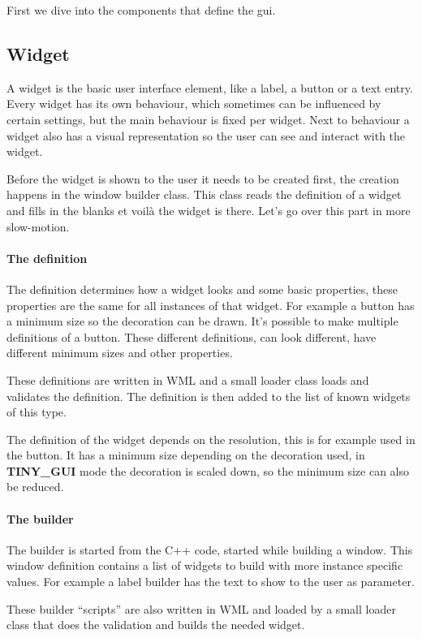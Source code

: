First we dive into the components that define the gui.

\subsection{Widget}

A widget is the basic user interface element, like a label, a button or a text
entry. Every widget has its own behaviour, which sometimes can be influenced by
certain settings, but the main behaviour is fixed per widget. Next to behaviour
a widget also has a visual representation so the user can see and interact with
the widget.

Before the widget is shown to the user it needs to be created first, the
creation happens in the window builder class. This class reads the definition of
a widget and fills in the blanks et voil\`a the widget is there. Let's go over
this part in more slow-motion.

\paragraph{The definition}
The definition determines how a widget looks and some basic properties, these
properties are the same for all instances of that widget. For example a button
has a minimum size so the decoration can be drawn. It's possible to make
multiple definitions of a button. These different definitions, can look
different, have different minimum sizes and other properties.

These definitions are written in WML and a small loader class loads and
validates the definition. The definition is then added to the list of known
widgets of this type.

The definition of the widget depends on the resolution, this is for example used
in the button. It has a minimum size depending on the decoration used, in
\textbf{TINY\_GUI} mode the decoration is scaled down, so the minimum size can
also be reduced.

\paragraph{The builder}
The builder is started from the C++ code, started while building a window. This
window definition contains a list of widgets to build with more instance specific
values. For example a label builder has the text to show to the user as
parameter.

These builder ``scripts'' are also written in WML and loaded by a small loader
class that does the validation and builds the needed widget.

